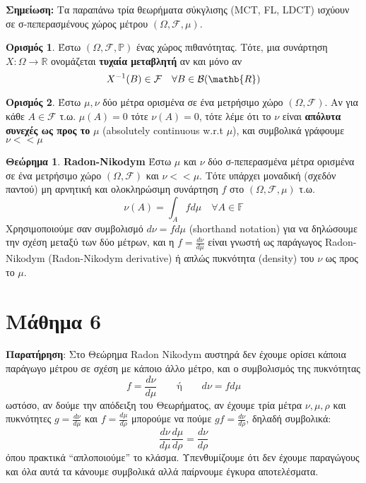 \documentclass[12pt,a4paper]{article}
\theoremstyle{definition}
\numberwithin{equation}{section}
\newtheorem{orismos}{Ορισμός}
\newtheorem{theorima}{Θεώρημα}
\begin{document}
{\textbf{Σημείωση:} Τα παραπάνω τρία θεωρήματα σύκγλισης (MCT, FL, LDCT)  ισχύουν σε σ-πεπερασμένους χώρος μέτρου \((\Omega, \mathcal{F}, \mu)\).\\

\begin{orismos} Έστω $(\Omega,\mathcal{F},\mathbb{P})$ ένας χώρος πιθανότητας. Τότε, μια συνάρτηση $X:\Omega \rightarrow \mathbb{R}$ ονομάζεται \textbf{τυχαία μεταβλητή} αν και μόνο αν
$$X^{-1}(B) \in \mathcal{F} \quad \forall B \in \mathcal{B}(\mathb{R})$$
\end{orismos}

\begin{orismos}
Έστω $\mu,\nu$ δύο μέτρα ορισμένα σε ένα μετρήσιμο χώρο $(\Omega, \mathcal{F})$. Αν για κάθε $A \in \mathcal{F}$ τ.ω. $\mu(A)=0$ τότε $\nu(A)=0$, τότε
λέμε ότι το $\nu$ είναι \textbf{απόλυτα συνεχές ως προς το} $\mu$ (absolutely continuous w.r.t $\mu$), και συμβολικά γράφουμε $\nu <\!< \mu$
\end{orismos}

\begin{theorima}\textbf{Radon-Nikodym}
Έστω $\mu$ και $\nu$ δύο σ-πεπερασμένα μέτρα ορισμένα σε ένα μετρήσιμο χώρο $(\Omega, \mathcal{F})$ και $\nu <\!< \mu$. Τότε υπάρχει μοναδική (σχεδόν παντού)
μη αρνητική και ολοκληρώσιμη συνάρτηση $f$ στο $(\Omega, \mathcal{F}, \mu)$ τ.ω.
$$ \nu(A) = \int_A f d\mu  \quad \forall A \in \mathbb{F}$$
Χρησιμοποιούμε σαν συμβολισμό $d\nu = f d\mu$ (shorthand notation) για να δηλώσουμε την σχέση μεταξύ των δύο μέτρων,
και η $f = \frac{d\nu}{d\mu}$ είναι γνωστή ως παράγωγος Radon-Nikodym (Radon-Nikodym derivative) ή απλώς πυκνότητα (density) του $\nu$ ως προς το $\mu$.
\end{theorima}

\pagebreak

\section{Μάθημα 6}
\label{sec:orgc46f329}

\textbf{Παρατήρηση}: Στο Θεώρημα Radon Nikodym αυστηρά δεν έχουμε ορίσει κάποια παράγωγο μέτρου σε σχέση με κάποιο άλλο μέτρο, και ο συμβολισμός της πυκνότητας
$$f = \frac{d\nu}{d\mu}\qquad \text{ή} \qquad d\nu = fd\mu$$
ωστόσο, αν δούμε την απόδειξη του Θεωρήματος, αν έχουμε τρία μέτρα \(\nu,\mu,\rho\) και πυκνότητες \(g=\frac{d\nu}{d\mu}\) και \(f=\frac{d\mu}{d\rho}\) μπορούμε να πούμε \(gf=\frac{d\nu}{d\rho}\), δηλαδή συμβολικά:
$$ \frac{d\nu}{d\mu} \frac{d\mu}{d\rho} = \frac{d\nu}{d\rho}$$
όπου πρακτικά ``απλοποιούμε'' το κλάσμα. Υπενθυμίζουμε ότι δεν έχουμε παραγώγους και όλα αυτά τα κάνουμε συμβολικά αλλά παίρνουμε έγκυρα αποτελέσματα.\\

}
\end{document}
